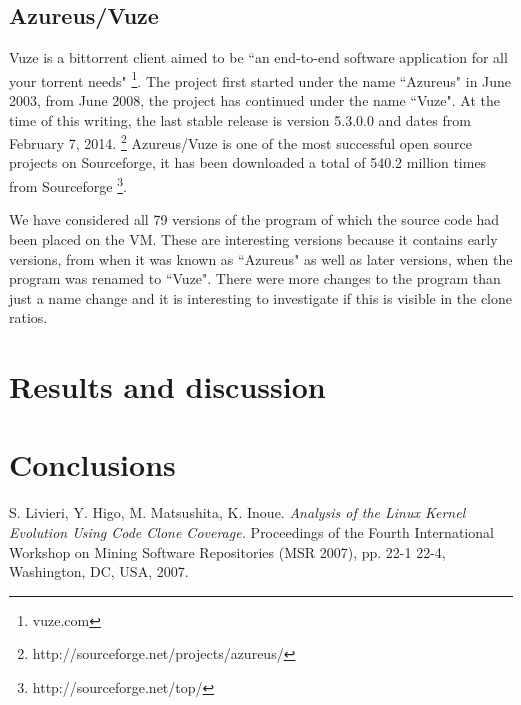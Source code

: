 \documentclass[a4paper,twoside, twocolumn, 11pt]{article}
\numberwithin{equation}{section}
\begin{document}
\subsection{Azureus/Vuze}
Vuze is a bittorrent client aimed to be ``an end-to-end software application for all your torrent needs" \footnote{vuze.com}.
The project first started under the name ``Azureus" in June 2003, from June 2008, the project has continued under the name ``Vuze".
At the time of this writing, the last stable release is version 5.3.0.0 and dates from February 7, 2014. \footnote{http://sourceforge.net/projects/azureus/}
Azureus/Vuze is one of the most successful open source projects on Sourceforge, it has been downloaded a total of 540.2 million times from Sourceforge \footnote{http://sourceforge.net/top/}.

We have considered all 79 versions of the program of which the source code had been placed on the VM. 
These are interesting versions because it contains early versions, from when it was known as ``Azureus" as well as later versions, when the program was renamed to ``Vuze".
There were more changes to the program than just a name change %
and it is interesting to investigate if this is visible in the clone ratios. %

\section{Results and discussion}

\section{Conclusions}

\begin{thebibliography}{9}
S. Livieri, Y. Higo, M. Matsushita, K. Inoue. \emph{Analysis of the Linux Kernel Evolution Using Code Clone Coverage.} Proceedings of the Fourth International Workshop on Mining Software Repositories (MSR 2007),  pp. 22-1 22-4, Washington, DC, USA, 2007.
\end{thebibliography}
\end{document}

